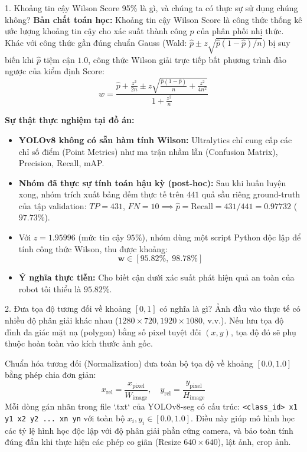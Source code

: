 \documentclass[11pt,a4paper]{article}
\begin{document}
\begin{qbox}{1. Khoảng tin cậy Wilson Score 95\% là gì, và chúng ta có thực sự sử dụng chúng không?}
\textbf{Bản chất toán học:} Khoảng tin cậy Wilson Score là công thức thống kê ước lượng khoảng tin cậy cho xác suất thành công $p$ của phân phối nhị thức. Khác với công thức gần đúng chuẩn Gauss (Wald: $\hat{p} \pm z\sqrt{\hat{p}(1-\hat{p})/n}$) bị suy biến khi $\hat{p}$ tiệm cận $1.0$, công thức Wilson giải trực tiếp bất phương trình đảo ngược của kiểm định Score:
\[
w = \frac{\hat{p} + \frac{z^2}{2n} \pm z \sqrt{\frac{\hat{p}(1 - \hat{p})}{n} + \frac{z^2}{4n^2}}}{1 + \frac{z^2}{n}}
\]

\textbf{Sự thật thực nghiệm tại đồ án:}
\begin{itemize}[leftmargin=1.5em]
    \item \textbf{YOLOv8 không có sẵn hàm tính Wilson:} Ultralytics chỉ cung cấp các chỉ số điểm (Point Metrics) như ma trận nhầm lẫn (Confusion Matrix), Precision, Recall, mAP.
    \item \textbf{Nhóm đã thực sự tính toán hậu kỳ (post-hoc):} Sau khi huấn luyện xong, nhóm trích xuất bảng đếm thực tế trên $441$ quả sầu riêng ground-truth của tập validation: $TP = 431$, $FN = 10 \implies \hat{p} = \text{Recall} = 431/441 = 0.97732$ ($97.73\%$).
    \item Với $z = 1.95996$ (mức tin cậy $95\%$), nhóm dùng một script Python độc lập để tính công thức Wilson, thu được khoảng:
    \[
    \mathbf{w \in [95.82\%, \; 98.78\%]}
    \]
    \item \textbf{Ý nghĩa thực tiễn:} Cho biết cận dưới xác suất phát hiện quả an toàn của robot tối thiểu là $95.82\%$.
\end{itemize}
\end{qbox}

\vspace{6pt}

\begin{qbox}{2. Đưa tọa độ tương đối về khoảng $[0, 1]$ có nghĩa là gì?}
Ảnh đầu vào thực tế có nhiều độ phân giải khác nhau ($1280 \times 720, 1920 \times 1080$, v.v.). Nếu lưu tọa độ đỉnh đa giác mặt nạ (polygon) bằng số pixel tuyệt đối $(x, y)$, tọa độ đó sẽ phụ thuộc hoàn toàn vào kích thước ảnh gốc.

Chuẩn hóa tương đối (Normalization) đưa toàn bộ tọa độ về khoảng $[0.0, 1.0]$ bằng phép chia đơn giản:
\[
x_{\text{rel}} = \frac{x_{\text{pixel}}}{W_{\text{image}}}, \quad y_{\text{rel}} = \frac{y_{\text{pixel}}}{H_{\text{image}}}
\]
Mỗi dòng gán nhãn trong file `.txt` của YOLOv8-seg có cấu trúc: \texttt{<class\_id> x1 y1 x2 y2 ... xn yn} với toàn bộ $x_i, y_i \in [0.0, 1.0]$. Điều này giúp mô hình học các tỷ lệ hình học độc lập với độ phân giải phần cứng camera, và bảo toàn tính đúng đắn khi thực hiện các phép co giãn (Resize $640 \times 640$), lật ảnh, crop ảnh.
\end{qbox}
\end{document}
